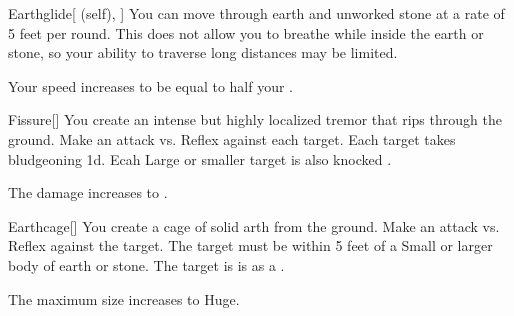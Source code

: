 \lowercase{\hypertarget{spell:Earthglide}{}}\label{spell:Earthglide}
\begin{attuneability}[Rank 5]{\hypertarget{spell:Earthglide}{Earthglide}}[ (self), ]
You can move through earth and unworked stone at a rate of 5 feet per round.
This does not allow you to breathe while inside the earth or stone, so your ability to traverse long distances may be limited.

\rankline
{} Your speed increases to be equal to half your .
\end{attuneability}
\vspace{0.25em}



\lowercase{\hypertarget{spell:Fissure}{}}\label{spell:Fissure}
\begin{freeability}[Rank 5]{\hypertarget{spell:Fissure}{Fissure}}[]
You create an intense but highly localized tremor that rips through the ground.
Make an attack vs. Reflex against each target.
\hit Each target takes bludgeoning  \minus1d.
Ecah Large or smaller target is also knocked .

\rankline
{} The damage increases to .
\end{freeability}
\vspace{0.25em}



\lowercase{\hypertarget{spell:Earthcage}{}}\label{spell:Earthcage}
\begin{freeability}[Rank 6]{\hypertarget{spell:Earthcage}{Earthcage}}[]
You create a cage of solid arth from the ground.
Make an attack vs. Reflex against the target.
The target must be within 5 feet of a Small or larger body of earth or stone.
\hit The target is is  as a .

\rankline
{} The maximum size increases to Huge.
\end{freeability}
\vspace{0.25em}



